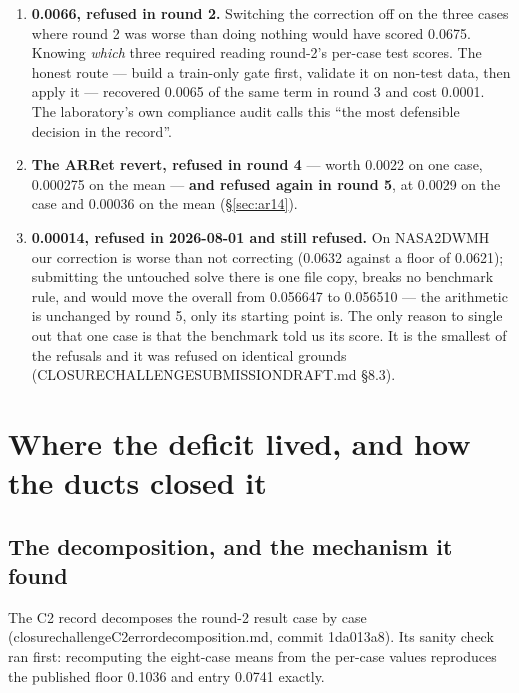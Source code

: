 \documentclass[11pt,a4paper]{article}
\newcommand{\breakus}{\textunderscore\allowbreak}
\newcommand{\code}[1]{{\small\ttfamily\let\_\breakus #1}}
\newcommand{\artifact}[1]{{\footnotesize\ttfamily\let\_\breakus #1}}
\begin{document}
\begin{enumerate}
\item \textbf{0.0066, refused in round 2.} Switching the correction off on the three cases
  where round 2 was worse than doing nothing would have scored 0.0675. Knowing \emph{which}
  three required reading round-2's per-case test scores. The honest route --- build a
  train-only gate first, validate it on non-test data, then apply it --- recovered 0.0065
  of the same term in round 3 and cost 0.0001. The laboratory's own compliance audit calls
  this ``the most defensible decision in the record''.
\item \textbf{The \code{AR\_14\_Ret\_180} revert, refused in round 4} --- worth 0.0022 on
  one case, 0.000275 on the mean --- \textbf{and refused again in round 5}, at 0.0029 on
  the case and 0.00036 on the mean (\S\ref{sec:ar14}).
\item \textbf{0.00014, refused in 2026-08-01 and still refused.} On \code{NASA\_2DWMH} our
  correction is worse than not correcting (0.0632 against a floor of 0.0621); submitting
  the untouched solve there is one file copy, breaks no benchmark rule, and would move the
  overall from 0.056647 to 0.056510 --- the arithmetic is unchanged by round 5, only its
  starting point is. The only reason to single out that one case is that the benchmark told
  us its score. It is the smallest of the refusals and it was refused on identical grounds
  (\artifact{CLOSURE\_CHALLENGE\_SUBMISSION\_DRAFT.md} \S8.3).
\end{enumerate}

\section{Where the deficit lived, and how the ducts closed it}

\subsection{The decomposition, and the mechanism it found}

The C2 record decomposes the round-2 result case by case
(\artifact{closure\_challenge\_C2\_error\_decomposition.md}, commit
\code{1da013a8}). Its sanity check ran first: recomputing the eight-case means from the
per-case values reproduces the published floor 0.1036 and entry 0.0741 exactly.
\end{document}
